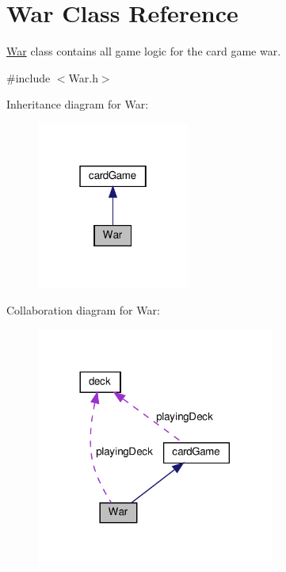 \hypertarget{classWar}{}\section{War Class Reference}
\label{classWar}


\hyperlink{classWar}{War} class contains all game logic for the card game war.  




{\ttfamily \#include $<$War.\+h$>$}



Inheritance diagram for War\+:\nopagebreak
\begin{figure}[H]
\begin{center}
\leavevmode
\includegraphics[width=142pt]{classWar__inherit__graph}
\end{center}
\end{figure}


Collaboration diagram for War\+:\nopagebreak
\begin{figure}[H]
\begin{center}
\leavevmode
\includegraphics[width=221pt]{classWar__coll__graph}
\end{center}
\end{figure}
